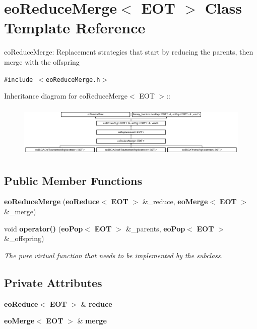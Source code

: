 \section{eo\-Reduce\-Merge$<$ EOT $>$ Class Template Reference}
\label{classeo_reduce_merge}
eo\-Reduce\-Merge: Replacement strategies that start by reducing the parents, then merge with the offspring  


{\tt \#include $<$eo\-Reduce\-Merge.h$>$}

Inheritance diagram for eo\-Reduce\-Merge$<$ EOT $>$::\begin{figure}[H]
\begin{center}
\leavevmode
\includegraphics[height=2.50896cm]{classeo_reduce_merge}
\end{center}
\end{figure}
\subsection*{Public Member Functions}
\begin{CompactItemize}
\item 
{\bf eo\-Reduce\-Merge} ({\bf eo\-Reduce}$<$ {\bf EOT} $>$ \&\_\-reduce, {\bf eo\-Merge}$<$ {\bf EOT} $>$ \&\_\-merge)\label{classeo_reduce_merge_a0}

\item 
void {\bf operator()} ({\bf eo\-Pop}$<$ {\bf EOT} $>$ \&\_\-parents, {\bf eo\-Pop}$<$ {\bf EOT} $>$ \&\_\-offspring)\label{classeo_reduce_merge_a1}

\begin{CompactList}\small\item\em The pure virtual function that needs to be implemented by the subclass. \item\end{CompactList}\end{CompactItemize}
\subsection*{Private Attributes}
\begin{CompactItemize}
\item 
{\bf eo\-Reduce}$<$ {\bf EOT} $>$ \& {\bf reduce}\label{classeo_reduce_merge_r0}

\item 
{\bf eo\-Merge}$<$ {\bf EOT} $>$ \& {\bf merge}\label{classeo_reduce_merge_r1}

\end{CompactItemize}


